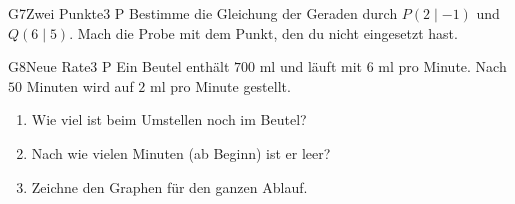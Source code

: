 \documentclass[11pt]{article}
\begin{document}
\begin{lpaufgabe}{G7}{Zwei Punkte}{3 P}
Bestimme die Gleichung der Geraden durch $P(2 \mid -1)$ und $Q(6 \mid 5)$. Mach die Probe mit dem Punkt, den du nicht eingesetzt hast.
\end{lpaufgabe}

\begin{lpaufgabe}{G8}{Neue Rate}{3 P}
Ein Beutel enthält $700$ ml und läuft mit $6$ ml pro Minute. Nach $50$ Minuten wird auf $2$ ml pro Minute gestellt.
\begin{enumerate}[label=(\alph*),leftmargin=*,itemsep=3pt]
\item Wie viel ist beim Umstellen noch im Beutel?
\item Nach wie vielen Minuten (ab Beginn) ist er leer?
\item Zeichne den Graphen für den ganzen Ablauf.
\end{enumerate}

\smallskip
\begin{minipage}[t]{0.5\linewidth}\vspace{0pt}
\end{minipage}\hfill
\begin{minipage}[t]{0.47\linewidth}\vspace{0pt}
\end{minipage}
\end{lpaufgabe}
\end{document}
